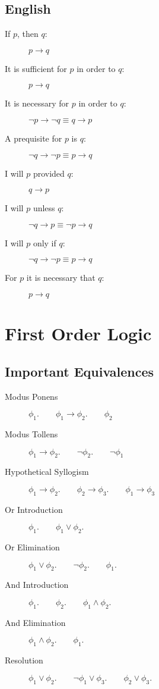 \documentclass[a4paper]{article}
\begin{document}
\subsection{English}
\begin{description}
    \item[If $p$, then $q$:] $p \to q$
    \item[It is sufficient for $p$ in order to $q$:] $p \to q$
    \item[It is necessary for $p$ in order to $q$:] $\neg p \to \neg q \equiv q \to p$
    \item[A prequisite for $p$ is $q$:] $\neg q \to \neg p \equiv p \to q$
    \item[I will $p$ provided $q$:] $q \to p$
    \item[I will $p$ unless $q$:] $\neg q \to p \equiv \neg p \to q$
    \item[I will $p$ only if $q$:] $\neg q \to \neg p \equiv p \to q$
    \item[For $p$ it is necessary that $q$:] $p \to q$
\end{description}
\section{First Order Logic}
\subsection{Important Equivalences}
\begin{description}
    \item[Modus Ponens] $\phi_{1}.\qquad \phi_{1} \to \phi_{2}.\qquad \phi_{2}$
    \item[Modus Tollens] $\phi_{1} \to \phi_{2}.\qquad \neg\phi_{2}.\qquad \neg\phi_{1}$
    \item[Hypothetical Syllogism] $\phi_{1} \to \phi_{2}.\qquad \phi_{2} \to \phi_{3}.\qquad \phi_{1} \to \phi_{3}$
    \item[Or Introduction] $\phi_{1}.\qquad \phi_{1} \lor \phi_{2}.$
    \item[Or Elimination] $\phi_{1} \lor \phi_{2}.\qquad \neg\phi_{2}.\qquad \phi_{1}.$
    \item[And Introduction] $\phi_{1}.\qquad \phi_{2}.\qquad \phi_{1} \land \phi_{2}.$
    \item[And Elimination] $\phi_{1} \land \phi_{2}.\qquad \phi_{1}.$
    \item[Resolution] $\phi_{1} \lor \phi_{2}.\qquad \neg\phi_{1} \lor \phi_{3}.\qquad \phi_{2} \lor \phi_{3}.$
\end{description}
\end{document}
